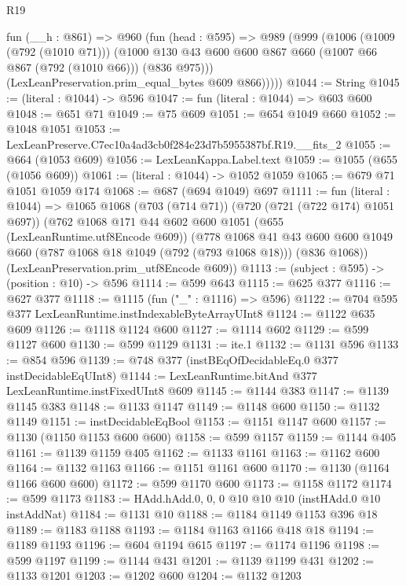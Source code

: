 \begin{lexlean}{R19}
\begin{coremodule}
      fun (__h : @861) =>
      @960
        (fun (head : @595) =>
        @989
          (@999
            (@1006
              (@1009 (@792 (@1010 @71)))
              (@1000 @130 @43 @600 @600 @867 @660 (@1007 @66 @867 (@792 (@1010 @66))) (@836 @975)))
            (LexLeanPreservation.prim_equal_bytes @609 @866)))))
@1044 := String
@1045 := (literal : @1044) -> @596
@1047 := fun (literal : @1044) => @603 @600
@1048 := @651 @71
@1049 := @75 @609
@1051 := @654 @1049 @660
@1052 := @1048 @1051
@1053 := LexLeanPreserve.C7ec10a4ad3cb0f284e23d7b5955387bf.R19.__fits_2
@1055 := @664 (@1053 @609)
@1056 := LexLeanKappa.Label.text
@1059 := @1055 (@655 (@1056 @609))
@1061 := (literal : @1044) -> @1052 @1059
@1065 := @679 @71 @1051 @1059 @174
@1068 := @687 (@694 @1049) @697
@1111 := fun (literal : @1044) =>
  @1065
    @1068
    (@703 (@714 @71))
    (@720 (@721 (@722 @174) @1051 @697))
    (@762
      @1068
      @171
      @44
      @602
      @600
      @1051
      (@655 (LexLeanRuntime.utf8Encode @609))
      (@778
        @1068
        @41
        @43
        @600
        @600
        @1049
        @660
        (@787 @1068 @18 @1049 (@792 (@793 @1068 @18)))
        (@836 @1068))
      (LexLeanPreservation.prim_utf8Encode @609))
@1113 := (subject : @595) -> (position : @10) -> @596
@1114 := @599 @643
@1115 := @625 @377
@1116 := @627 @377
@1118 := @1115 (fun ("_" : @1116) => @596)
@1122 := @704 @595 @377 LexLeanRuntime.instIndexableByteArrayUInt8
@1124 := @1122 @635 @609
@1126 := @1118 @1124 @600
@1127 := @1114 @602
@1129 := @599 @1127 @600
@1130 := @599 @1129
@1131 := ite.{1}
@1132 := @1131 @596
@1133 := @854 @596
@1139 := @748 @377 (instBEqOfDecidableEq.{0} @377 instDecidableEqUInt8)
@1144 := LexLeanRuntime.bitAnd @377 LexLeanRuntime.instFixedUInt8 @609
@1145 := @1144 @383
@1147 := @1139 @1145 @383
@1148 := @1133 @1147
@1149 := @1148 @600
@1150 := @1132 @1149
@1151 := instDecidableEqBool
@1153 := @1151 @1147 @600
@1157 := @1130 (@1150 @1153 @600 @600)
@1158 := @599 @1157
@1159 := @1144 @405
@1161 := @1139 @1159 @405
@1162 := @1133 @1161
@1163 := @1162 @600
@1164 := @1132 @1163
@1166 := @1151 @1161 @600
@1170 := @1130 (@1164 @1166 @600 @600)
@1172 := @599 @1170 @600
@1173 := @1158 @1172
@1174 := @599 @1173
@1183 := HAdd.hAdd.{0, 0, 0} @10 @10 @10 (instHAdd.{0} @10 instAddNat)
@1184 := @1131 @10
@1188 := @1184 @1149 @1153 @396 @18
@1189 := @1183 @1188
@1193 := @1184 @1163 @1166 @418 @18
@1194 := @1189 @1193
@1196 := @604 @1194 @615
@1197 := @1174 @1196
@1198 := @599 @1197
@1199 := @1144 @431
@1201 := @1139 @1199 @431
@1202 := @1133 @1201
@1203 := @1202 @600
@1204 := @1132 @1203

\end{coremodule}
\end{lexlean}
